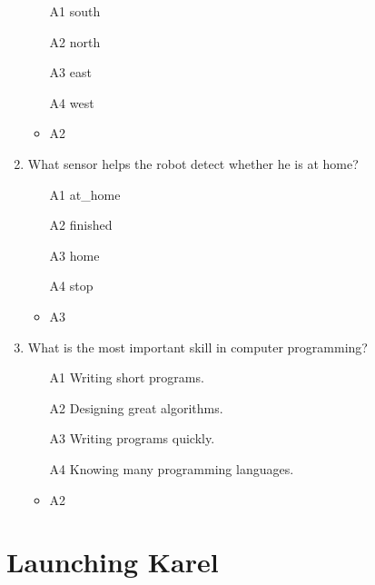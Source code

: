 \documentclass[article,A4,12pt]{llncs}
\begin{document}
\begin{enumerate}
\begin{enumerate}
\item[A1] south
\item[A2] north
\item[A3] east
\item[A4] west
\end{enumerate}
  \begin{itemize}
    \item A2
  \end{itemize}
\item What sensor helps the robot detect whether he is at home?
\begin{enumerate}
\item[A1] at\_home
\item[A2] finished
\item[A3] home
\item[A4] stop
\end{enumerate}
  \begin{itemize}
    \item A3
  \end{itemize}
\item What is the most important skill in computer programming?
\begin{enumerate}
\item[A1] Writing short programs.
\item[A2] Designing great algorithms.
\item[A3] Writing programs quickly.
\item[A4] Knowing many programming languages.
\end{enumerate}
  \begin{itemize}
    \item A2
  \end{itemize}
\end{enumerate}

\section{Launching Karel}
\end{document}
